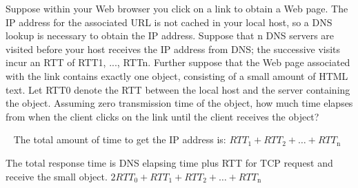 \begin{exercise}[]{Suppose within your Web browser you click on a link to obtain a Web page. The IP address for the associated URL is not cached in your local host, so a DNS lookup is necessary to obtain the IP address. Suppose that n DNS servers are visited before your host receives the IP address from DNS; the successive visits incur an RTT of RTT1, ..., RTTn. Further suppose that the Web page associated with the link contains exactly one object, consisting of a small amount of HTML text. Let RTT0 denote the RTT between the local host and the server containing the object. Assuming zero transmission time of the object, how much time elapses from when the client clicks on the link until the client receives the object?
    
    }
  \begin{solution}
  \par{~}
  The total amount of time to get the IP address is: $RTT_{1}+RTT_{2}+\ldots+RTT_{\mathrm{n}}$

  The total response time is DNS elapsing time plus RTT for TCP request and receive the small object. 
    $2 RTT_{0}+RTT_{1}+RTT_{2}+\ldots+RTT_{\mathrm{n}}$
  \end{solution}
  \label{ex4}
\end{exercise}


